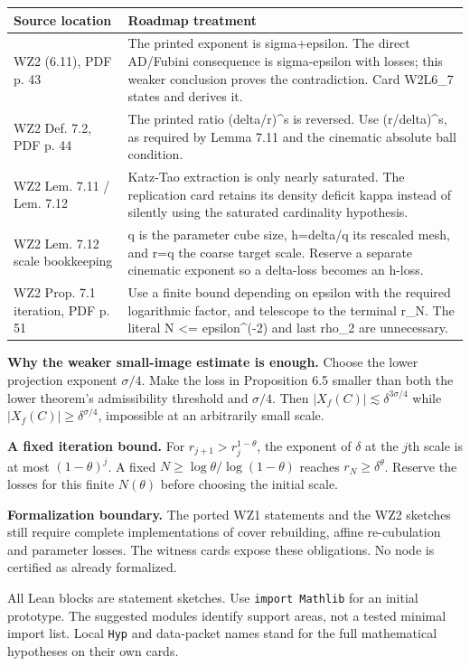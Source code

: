 \documentclass[10pt,a4paper]{article}
\newcommand{\sectitle}[1]{\clearpage{\sffamily\Large\bfseries\color{navy}#1}\par\medskip}
\begin{document}
\begin{longtable}{@{}p{.29\linewidth}p{.66\linewidth}@{}}\toprule Source location & Roadmap treatment\\\midrule\endhead
WZ2 (6.11), PDF p. 43 & The printed exponent is sigma+epsilon. The direct AD/Fubini consequence is sigma-epsilon with losses; this weaker conclusion proves the contradiction. Card W2L6\_7 states and derives it.\\
WZ2 Def. 7.2, PDF p. 44 & The printed ratio (delta/r)\textasciicircum{}s is reversed. Use (r/delta)\textasciicircum{}s, as required by Lemma 7.11 and the cinematic absolute ball condition.\\
WZ2 Lem. 7.11 / Lem. 7.12 & Katz-Tao extraction is only nearly saturated. The replication card retains its density deficit kappa instead of silently using the saturated cardinality hypothesis.\\
WZ2 Lem. 7.12 scale bookkeeping & q is the parameter cube size, h=delta/q its rescaled mesh, and r=q the coarse target scale. Reserve a separate cinematic exponent so a delta-loss becomes an h-loss.\\
WZ2 Prop. 7.1 iteration, PDF p. 51 & Use a finite bound depending on epsilon with the required logarithmic factor, and telescope to the terminal r\_N. The literal N <= epsilon\textasciicircum{}(-2) and last rho\_2 are unnecessary.\\
\bottomrule\end{longtable}
\textbf{Why the weaker small-image estimate is enough.} Choose the lower projection exponent $\sigma/4$. Make the loss in Proposition 6.5 smaller than both the lower theorem's admissibility threshold and $\sigma/4$. Then $|X_f(C)|\lesssim\delta^{3\sigma/4}$ while $|X_f(C)|\ge\delta^{\sigma/4}$, impossible at an arbitrarily small scale.

\textbf{A fixed iteration bound.} For $r_{j+1}>r_j^{1-\theta}$, the exponent of $\delta$ at the $j$th scale is at most $(1-\theta)^j$. A fixed $N\ge\log\theta/\log(1-\theta)$ reaches $r_N\ge\delta^\theta$. Reserve the losses for this finite $N(\theta)$ before choosing the initial scale.

\textbf{Formalization boundary.} The ported WZ1 statements and the WZ2 sketches still require complete implementations of cover rebuilding, affine re-cubulation and parameter losses. The witness cards expose these obligations. No node is certified as already formalized.
\sectitle{Lean interface conventions and support}
All Lean blocks are statement sketches. Use \texttt{import Mathlib} for an initial prototype. The suggested modules identify support areas, not a tested minimal import list. Local \texttt{Hyp} and data-packet names stand for the full mathematical hypotheses on their own cards.
\end{document}
